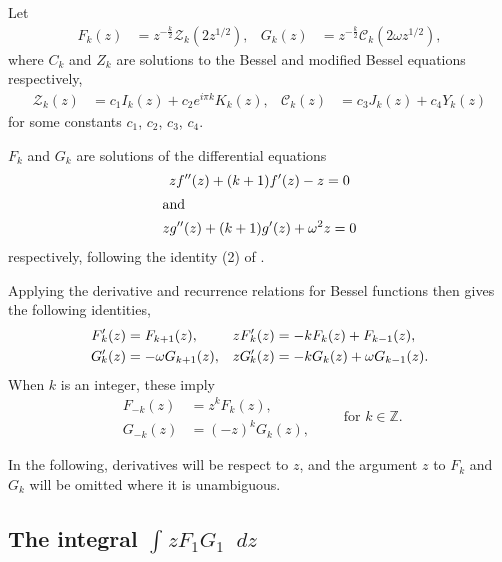 \documentclass[parskip=half]{scrartcl}
\newcommand{\Int}[2]{\int_{#1}^{#2}\!}
\newcommand{\D}{\mathop{}\!d}
\newcommand{\cZ}{\mathcal{Z}}
\newcommand{\cC}{\mathcal{C}}
\theoremstyle{nonumberplain}
\begin{document}
Let
\begin{equation}
    \begin{aligned}
        F_k(z) &= z^{-\frac{k}{2}}\cZ_k(2z^{1/2}),&
        G_k(z) &= z^{-\frac{k}{2}}\cC_k(2\omega z^{1/2}),
    \end{aligned}
\end{equation}
where $C_k$ and $Z_k$ are solutions to the Bessel and modified Bessel equations
respectively,
\begin{equation}
    \begin{aligned}
        \cZ_k(z) &= c_1 I_k(z) + c_2 e^{i\pi k} K_k(z),&
        \cC_k(z) &= c_3 J_k(z) + c_4 Y_k(z)
    \end{aligned}
\end{equation}
for some constants $c_1$, $c_2$, $c_3$, $c_4$.

$F_k$ and $G_k$ are solutions of the differential equations
\begin{gather}
    z f''(z) + (k+1) f'(z) - z = 0\\
    \intertext{and}
    z g''(z) + (k+1) g'(z) + \omega^2 z = 0
\end{gather}
respectively, following the identity (2) of \autocite[p.~512]{lommel1879}.

Applying the derivative and recurrence relations for Bessel functions
\autocite[\S 10.6, \S10.29]{nistdlmf} then gives the following identities,
\begin{align}
    \label{eq:fgrel}
    \Fp_k(z) &= F_{k+1}(z), & z \Fp_k(z) &= -k F_k(z) + F_{k-1}(z),\\
    \Gp_k(z) &= -\omega G_{k+1}(z), & z \Gp_k(z) &= -k G_k(z) + \omega G_{k-1}(z).
\end{align}
When $k$ is an integer, these imply
\begin{equation}
    \begin{aligned}
        F_{-k}(z) &= z^k F_k(z),\\
        G_{-k}(z) &= (-z)^k G_k(z),
    \end{aligned}
    \qquad \text{for $k\in\mathbb{Z}$}.
\end{equation}

In the following, derivatives will be respect to $z$, and the argument $z$ to
$F_k$ and $G_k$ will be omitted where it is unambiguous.

\subsection*{The integral $\Int{}{} z F_1 G_1 \D z$}
\end{document}
